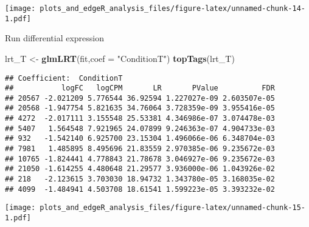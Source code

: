 \documentclass[]{article}
\newenvironment{Shaded}{\begin{snugshade}}{\end{snugshade}}
\newcommand{\KeywordTok}[1]{\textcolor[rgb]{0.13,0.29,0.53}{\textbf{#1}}}
\newcommand{\DataTypeTok}[1]{\textcolor[rgb]{0.13,0.29,0.53}{#1}}
\newcommand{\StringTok}[1]{\textcolor[rgb]{0.31,0.60,0.02}{#1}}
\newcommand{\OperatorTok}[1]{\textcolor[rgb]{0.81,0.36,0.00}{\textbf{#1}}}
\newcommand{\NormalTok}[1]{#1}
\begin{document}
\texttt{[image: plots\_and\_edgeR\_analysis\_files/figure-latex/unnamed-chunk-14-1.pdf]}

\begin{Shaded}
\end{Shaded}

Run differential expression

\begin{Shaded}
\begin{Highlighting}[]
\NormalTok{lrt_T <-}\StringTok{ }\KeywordTok{glmLRT}\NormalTok{(fit,}\DataTypeTok{coef =} \StringTok{"ConditionT"}\NormalTok{)}
\KeywordTok{topTags}\NormalTok{(lrt_T)}
\end{Highlighting}
\end{Shaded}

\begin{verbatim}
## Coefficient:  ConditionT 
##           logFC   logCPM       LR       PValue          FDR
## 20567 -2.021209 5.776544 36.92594 1.227027e-09 2.603507e-05
## 20568 -1.947754 5.821635 34.76064 3.728359e-09 3.955416e-05
## 4272  -2.017111 3.155548 25.53381 4.346986e-07 3.074478e-03
## 5407   1.564548 7.921965 24.07899 9.246363e-07 4.904733e-03
## 932   -1.542140 6.925700 23.15304 1.496066e-06 6.348704e-03
## 7981   1.485895 8.495696 21.83559 2.970385e-06 9.235672e-03
## 10765 -1.824441 4.778843 21.78678 3.046927e-06 9.235672e-03
## 21050 -1.614255 4.480648 21.29577 3.936000e-06 1.043926e-02
## 218   -2.123615 3.703030 18.94732 1.343780e-05 3.168035e-02
## 4099  -1.484941 4.503708 18.61541 1.599223e-05 3.393232e-02
\end{verbatim}

\begin{Shaded}
\end{Shaded}

\texttt{[image: plots\_and\_edgeR\_analysis\_files/figure-latex/unnamed-chunk-15-1.pdf]}
\end{document}
